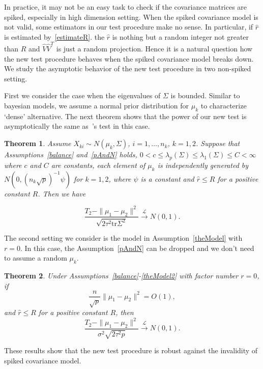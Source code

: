 \documentclass[review]{elsarticle}
\theoremstyle{plain}
\newtheorem{theorem}{\quad\quad Theorem}
\theoremstyle{definition}
\theoremstyle{remark}
\begin{document}
In practice, it may not be an easy task to check if the covariance matrices are spiked, especially in high dimension setting.
When the spiked covariance model is not valid,
some estimators in our test procedure make no sense.
In particular, if $\hat{r}$ is estimated by~\eqref{estimateR}.
the $\hat{r}$ is nothing but a random integer not greater than $R$ and $\hat{V}\hat{V}^T$ is just a random projection.
Hence it is a natural question how the new test procedure behaves when the spiked covariance model breaks down.
We study the asymptotic behavior of the new test procedure in two non-spiked setting.

First we consider the case  when the eigenvalues of $\Sigma$ is bounded.
Similar to bayesian models, we assume a normal prior distribution for $\mu_k$ to characterize `dense' alternative.
The next theorem shows that  the power of our new test is asymptotically the same as~\cite{Chen2010A}'s test in this case.


\begin{theorem}\label{sameTheorem}
   Assume $X_{ki}\sim N(\mu_k,\Sigma)$,  $i=1,\ldots,n_k$, $k=1,2$.
    Suppose that Assumptions~\ref{balance} and~\ref{pAndN} holds, $0<c\leq\lambda_p(\Sigma)\leq\lambda_1(\Sigma)\leq C<\infty$ where $c$ and $C$ are constants, each element of $\mu_k$ is independently generated by $N(0,{(n_k\sqrt{p})}^{-1}\psi)$ for $k=1,2$, where $\psi$ is a constant and  $\hat{r}\leq R$ for a positive constant $R$.
    Then we have
    
\begin{equation*}
    \frac{T_2-\|\mu_1-\mu_2\|^2}{\sqrt{2\tau^2 \mathrm{tr}\Sigma^2}} \xrightarrow{\mathcal{L}} N(0,1).
\end{equation*}
\end{theorem}

The second setting we consider is the model in Assumption~\ref{theModel} with $r=0$.
In this case, the Assumption~\ref{pAndN} can be dropped and we don't need to assume a random $\mu_k$.

\begin{theorem}\label{sameTheorem2}
    Under Assumptions~\ref{balance}-\ref{theModel2} with factor number $r=0$, if
    $$
    \frac{n}{\sqrt{p}}\|\mu_1-\mu_2\|^2=O(1),
    $$
    and $\hat{r}\leq R$ for a positive constant $R$,
    then
    $$
    \frac{T_2-\|\mu_1-\mu_2\|^2}{\sigma^2\sqrt{2\tau^2 p}}\xrightarrow{\mathcal{L}} N(0,1).
    $$
\end{theorem}
These results show that the new test procedure is robust against the invalidity of spiked covariance model.
\end{document}
